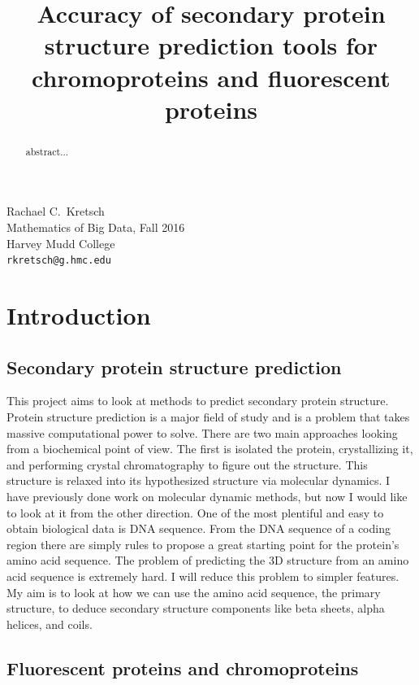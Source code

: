 \documentclass{article}
\title{Accuracy of secondary protein structure prediction tools for chromoproteins and fluorescent proteins}
\begin{document}

 Rachael C.~Kretsch \\
 Mathematics of Big Data, Fall 2016\\
 Harvey Mudd College\\
 \texttt{rkretsch@g.hmc.edu} \\

\maketitle

\begin{abstract}
   abstract...
\end{abstract}

\section{Introduction}

\subsection{Secondary protein structure prediction}

This project aims to look at methods to predict secondary protein structure. Protein structure prediction is a major field of study and is a problem that takes massive computational power to solve. There are two main approaches looking from a biochemical point of view. The first is isolated the protein, crystallizing it, and performing crystal chromatography to figure out the structure. This structure is relaxed into its hypothesized structure via molecular dynamics. I have previously done work on molecular dynamic methods, but now I would like to look at it from the other direction. One of the most plentiful and easy to obtain biological data is DNA sequence. From the DNA sequence of a coding region there are simply rules to propose a great starting point for the protein's amino acid sequence. The problem of predicting the 3D structure from an amino acid sequence is extremely hard. I will reduce this problem to simpler features. My aim is to look at how we can use the amino acid sequence, the primary structure, to deduce secondary structure components like beta sheets, alpha helices, and coils. 

\subsection{Fluorescent proteins and chromoproteins}
\end{document}
